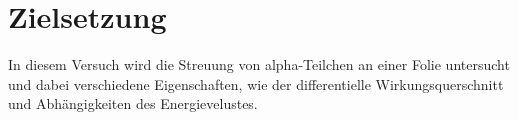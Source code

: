 \section{Zielsetzung}

\label{sec:Zielsetzung}
In diesem Versuch wird die Streuung von alpha-Teilchen an einer Folie untersucht und dabei verschiedene Eigenschaften, wie
der differentielle Wirkungsquerschnitt und Abhängigkeiten des Energievelustes.
